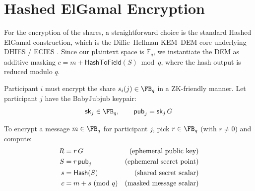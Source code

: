 
%
%

\section{Hashed ElGamal Encryption}
\label{appendix:hashed-elgamal}



For the encryption of the shares, a straightforward choice is the standard Hashed ElGamal construction, which is the Diffie--Hellman KEM--DEM core underlying DHIES / ECIES \cite{cash_kiltz_shoup_twin_dh_2008, abdalla_bellare_rogaway_dhies_2001}.
Since our plaintext space is $\mathbb{F}_q$, we instantiate the DEM as additive masking
$c = m + \mathsf{HashToField}(S) \bmod q$, where the hash output is reduced modulo $q$.

Participant $i$ must encrypt the share $s_i(j) \in \FB_q$ in a ZK-friendly manner. Let participant $j$ have the BabyJubjub keypair:
\[
    \mathsf{sk}_j \in \FB_q, \qquad \mathsf{pub}_j = \mathsf{sk}_j \, G
\]

To encrypt a message $m \in \FB_q$ for participant $j$, pick $r \in \FB_q$ (with $r \neq 0$) and compute:
\begin{align*}
    R &= r \, G \hspace{.05cm } &\text{(ephemeral public key)}\\
    S &= r \, \mathsf{pub}_j  &\text{(ephemeral secret point)}\\
    s &= \mathsf{Hash}(S) &\text{(shared secret scalar)}\\
    c &= m + s \text{ (mod } q \text{)} &\text{(masked message scalar)}
\end{align*}

